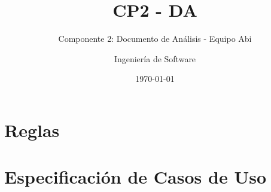 \documentclass[10pt]{book}
\title{CP2 - DA}
\subtitle{Componente 2: Documento de Análisis - Equipo Abi}
\author{Ingeniería de Software}
\date{\today}
\begin{document}
\maketitle
\thispagestyle{empty}
\tableofcontents

%
%
\chapter{Reglas}

\chapter{Especificación de Casos de Uso}

%



%

\end{document}
